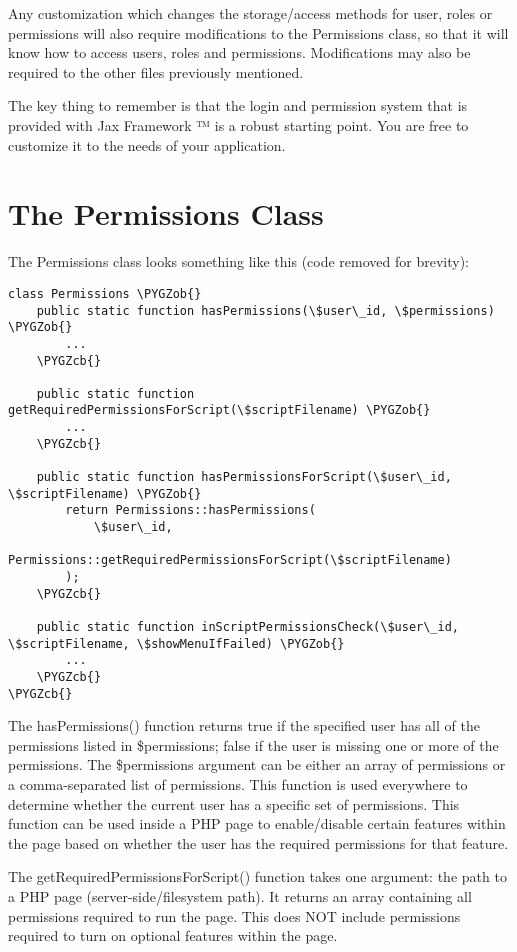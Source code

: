 \documentclass[letterpaper,10pt,english]{sphinxmanual}
\def\PYGZob{\char`\{}
\def\PYGZcb{\char`\}}
\begin{document}
Any customization which changes the storage/access methods for user, roles or permissions will also
require modifications to the Permissions class, so that it will know how to access users, roles and
permissions.  Modifications may also be required to the other files previously mentioned.

The key thing to remember is that the login and permission system that is provided with Jax
Framework ™ is a robust starting point.  You are free to customize it to the needs of your
application.


\section{The Permissions Class}
\label{jaxFrameworkGuide:the-permissions-class}
The Permissions class looks something like this (code removed for brevity):

\begin{Verbatim}[commandchars=\\\{\}]
class Permissions \PYGZob{}
    public static function hasPermissions(\$user\_id, \$permissions) \PYGZob{}
        ...
    \PYGZcb{}

    public static function getRequiredPermissionsForScript(\$scriptFilename) \PYGZob{}
        ...
    \PYGZcb{}

    public static function hasPermissionsForScript(\$user\_id, \$scriptFilename) \PYGZob{}
        return Permissions::hasPermissions(
            \$user\_id,
            Permissions::getRequiredPermissionsForScript(\$scriptFilename)
        );
    \PYGZcb{}

    public static function inScriptPermissionsCheck(\$user\_id, \$scriptFilename, \$showMenuIfFailed) \PYGZob{}
        ...
    \PYGZcb{}
\PYGZcb{}
\end{Verbatim}

The hasPermissions() function returns true if the specified user has all of the permissions listed
in \$permissions; false if the user is missing one or more of the permissions. The \$permissions
argument can be either an array of permissions or a comma-separated list of permissions.  This
function is used everywhere to determine whether the current user has a specific set of permissions.
This function can be used inside a PHP page to enable/disable certain features within the page based
on whether the user has the required permissions for that feature.

The getRequiredPermissionsForScript() function takes one argument: the path to a PHP page
(server-side/filesystem path).  It returns an array containing all permissions required to run the
page.  This does NOT include permissions required to turn on optional features within the page.
\end{document}
